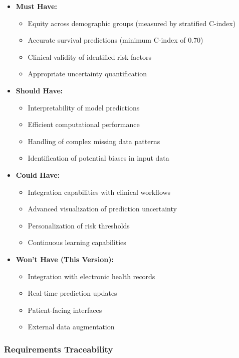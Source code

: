 \begin{itemize}
    \item \textbf{Must Have:}
    \begin{itemize}
        \item Equity across demographic groups (measured by stratified C-index)
        \item Accurate survival predictions (minimum C-index of 0.70)
        \item Clinical validity of identified risk factors
        \item Appropriate uncertainty quantification
    \end{itemize}
    
    \item \textbf{Should Have:}
    \begin{itemize}
        \item Interpretability of model predictions
        \item Efficient computational performance
        \item Handling of complex missing data patterns
        \item Identification of potential biases in input data
    \end{itemize}
    
    \item \textbf{Could Have:}
    \begin{itemize}
        \item Integration capabilities with clinical workflows
        \item Advanced visualization of prediction uncertainty
        \item Personalization of risk thresholds
        \item Continuous learning capabilities
    \end{itemize}
    
    \item \textbf{Won't Have (This Version):}
    \begin{itemize}
        \item Integration with electronic health records
        \item Real-time prediction updates
        \item Patient-facing interfaces
        \item External data augmentation
    \end{itemize}
\end{itemize}

\subsubsection{Requirements Traceability}

